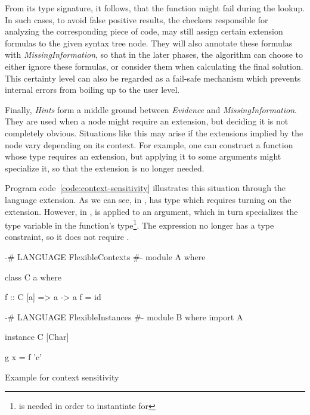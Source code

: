 \documentclass[main.tex]{subfiles}
\begin{document}
	\noindent
	From its type signature, it follows, that the function might fail during the lookup. In such cases, to avoid false positive results, the checkers responsible for analyzing the corresponding piece of code, may still assign certain extension formulas to the given syntax tree node. They will also annotate these formulas with \emph{MissingInformation}, so that in the later phases, the algorithm can choose to either ignore these formulas, or consider them when calculating the final solution.	This certainty level can also be regarded as a fail-safe mechanism which prevents internal errors from boiling up to the user level. 
	
	Finally, \emph{Hints} form a middle ground between \emph{Evidence} and \emph{MissingInformation}. They are used when a node might require an extension, but deciding it is not completely obvious. Situations like this may arise if the extensions implied by the node vary depending on its context. For example, one can construct a function whose type requires an extension, but applying it to some arguments might specialize it, so that the extension is no longer needed.
	
	Program code~\ref{code:context-sensitivity} illustrates this situation through the  language extension. As we can see, in ,  has type which requires turning on the extension. However, in ,  is applied to an argument, which in turn specializes the type variable in the function's type\footnote{ is needed in order to instantiate  for \ilcode{[Char]}}. The expression  no longer has a type constraint, so it does not require . 
		
	\noindent
	\begin{codeFloat}[H]
		\begin{minipage}{0.47\textwidth}
			\begin{haskell}
				{-# LANGUAGE FlexibleContexts #-}
				module A where
				
				class C a where
				
				f :: C [a] => a -> a
				f = id
			\end{haskell}
		\end{minipage}
		\hfill
		\begin{minipage}{0.50\textwidth}
			\begin{haskell}	
				{-# LANGUAGE FlexibleInstances #-}
				module B where		
				import A
				
				instance C [Char]
				
				g x = f 'c'
			\end{haskell}
		\end{minipage}
	\caption{Example for context sensitivity}
	\label{code:context-sensitivity}
	\end{codeFloat}
	
\end{document}
